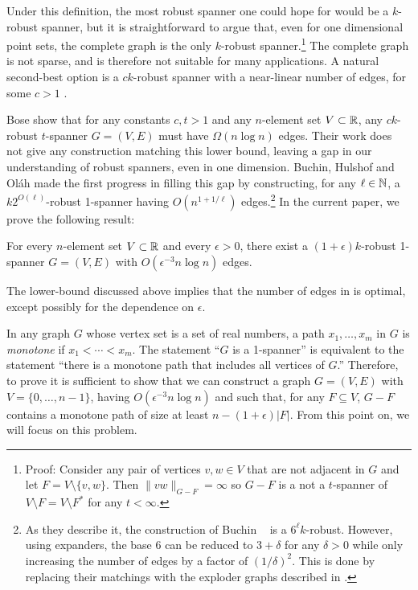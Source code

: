 \documentclass{patmorin}
\begin{document}
Under this definition, the most robust spanner one could hope for
would be a $k$-robust spanner, but it is straightforward to argue
that, even for one dimensional point sets, the complete graph is the
only $k$-robust spanner.\footnote{Proof: Consider any pair of vertices
$v,w\in V$ that are not adjacent in $G$ and let $F=V\setminus\{v,w\}$.
Then $\|vw\|_{G-F}=\infty$ so $G-F$ is a not a $t$-spanner of $V\setminus
F=V\setminus F^*$ for any $t<\infty$.} The complete graph is not sparse,
and is therefore not suitable for many applications. A natural second-best
option is a $ck$-robust spanner with a near-linear number of edges,
for some $c>1$ .

Bose \etal \cite[Theorem~3]{bose.dujmovic.ea:robust} show that for any
constants $c,t>1$ and any $n$-element set $V\subset\mathbb{R}$, any $ck$-robust
$t$-spanner $G=(V,E)$ must have $\Omega(n\log n)$ edges.  Their work
does not give any construction matching this lower bound, leaving a
gap in our understanding of robust spanners, even in one dimension.
Buchin, Hulshof and Ol\'ah \cite{buchin.hulshof.olah:robust} made the
first progress in filling this gap by constructing, for any $\ell\in\mathbb{N}$,
a $k2^{O(\ell)}$-robust 1-spanner having $O(n^{1+1/\ell})$
edges.\footnote{As they describe it, the construction of Buchin \etal\
\cite{buchin.hulshof.olah:robust} is a $6^\ell k$-robust.  However,
using expanders, the base $6$ can be reduced to $3+\delta$ for
any $\delta >0$ while only increasing the number of edges by a factor
of $(1/\delta)^2$.  This is done by replacing their matchings with the
exploder graphs described in \thmref{exploder}.}  In the current paper,
we prove the following result:

\begin{thm}
  For every $n$-element set $V\subset\mathbb{R}$ and every $\epsilon>0$,
  there exist a $(1+\epsilon)k$-robust 1-spanner $G=(V,E)$ with
  $O(\epsilon^{-3}n\log n)$ edges.
\end{thm}

The lower-bound discussed above implies that the number of edges
in \thmref{main} is optimal, except possibly for the dependence on
$\epsilon$.

In any graph $G$ whose vertex set is a set of real numbers, a path
$x_1,\ldots,x_m$ in $G$ is \emph{monotone} if $x_1<\cdots<x_m$.
The statement ``$G$ is a 1-spanner'' is equivalent to the statement
``there is a monotone path that includes all vertices of $G$.'' Therefore,
to prove \thmref{main} it is sufficient to show that we can construct a
graph $G=(V,E)$ with $V=\{0,\ldots,n-1\}$, having $O(\epsilon^{-3} n\log n)$
and such that, for any $F\subseteq V$, $G-F$ contains a monotone path
of size at least $n-(1+\epsilon)|F|$.  From this point on, we will focus
on this problem.
\end{document}

